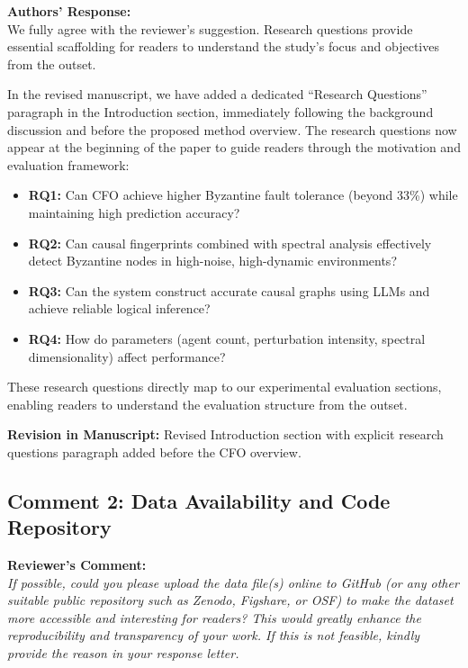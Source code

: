 \documentclass[11pt,a4paper]{article}
\newcommand{\reviewercomment}[1]{%
  \vspace{6pt}\noindent\textbf{\textcolor{reviewercolor}{Reviewer's Comment:}}\\
  \textcolor{reviewercolor}{\itshape #1}\vspace{4pt}}
\newcommand{\response}[1]{%
  \noindent\textbf{\textcolor{responsecolor}{Authors' Response:}}\\
  #1\vspace{8pt}}
\newcommand{\revision}[1]{%
  \noindent\textbf{Revision in Manuscript:} #1\vspace{4pt}}
\begin{document}
\response{We fully agree with the reviewer's suggestion. Research questions provide essential scaffolding for readers to understand the study's focus and objectives from the outset.

In the revised manuscript, we have added a dedicated ``Research Questions'' paragraph in the Introduction section, immediately following the background discussion and before the proposed method overview. The research questions now appear at the beginning of the paper to guide readers through the motivation and evaluation framework:

\begin{itemize}[nosep]
\item \textbf{RQ1:} Can CFO achieve higher Byzantine fault tolerance (beyond 33\%) while maintaining high prediction accuracy?
\item \textbf{RQ2:} Can causal fingerprints combined with spectral analysis effectively detect Byzantine nodes in high-noise, high-dynamic environments?
\item \textbf{RQ3:} Can the system construct accurate causal graphs using LLMs and achieve reliable logical inference?
\item \textbf{RQ4:} How do parameters (agent count, perturbation intensity, spectral dimensionality) affect performance?
\end{itemize}

These research questions directly map to our experimental evaluation sections, enabling readers to understand the evaluation structure from the outset.}

\revision{Revised Introduction section with explicit research questions paragraph added before the CFO overview.}

\subsection*{Comment 2: Data Availability and Code Repository}

\reviewercomment{If possible, could you please upload the data file(s) online to GitHub (or any other suitable public repository such as Zenodo, Figshare, or OSF) to make the dataset more accessible and interesting for readers? This would greatly enhance the reproducibility and transparency of your work. If this is not feasible, kindly provide the reason in your response letter.}
\end{document}
